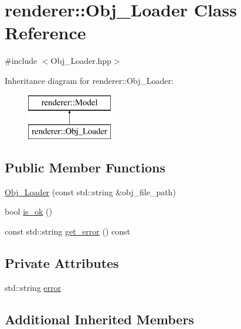 \hypertarget{classrenderer_1_1_obj___loader}{}\section{renderer\+::Obj\+\_\+\+Loader Class Reference}
\label{classrenderer_1_1_obj___loader}


{\ttfamily \#include $<$Obj\+\_\+\+Loader.\+hpp$>$}

Inheritance diagram for renderer\+::Obj\+\_\+\+Loader\+:\begin{figure}[H]
\begin{center}
\leavevmode
\includegraphics[height=2.000000cm]{classrenderer_1_1_obj___loader}
\end{center}
\end{figure}
\subsection*{Public Member Functions}
\begin{DoxyCompactItemize}
\item 
\mbox{\hyperlink{classrenderer_1_1_obj___loader_ad6709f396cb0203c20f3f4b82722570b}{Obj\+\_\+\+Loader}} (const std\+::string \&obj\+\_\+file\+\_\+path)
\item 
bool \mbox{\hyperlink{classrenderer_1_1_obj___loader_a2d697790143483361863d720370f758b}{is\+\_\+ok}} ()
\item 
const std\+::string \mbox{\hyperlink{classrenderer_1_1_obj___loader_a66ea56ee2d007bd9fc962889316b831c}{get\+\_\+error}} () const
\end{DoxyCompactItemize}
\subsection*{Private Attributes}
\begin{DoxyCompactItemize}
\item 
std\+::string \mbox{\hyperlink{classrenderer_1_1_obj___loader_a2852df3e4b485281d766b3420418c0e5}{error}}
\end{DoxyCompactItemize}
\subsection*{Additional Inherited Members}


